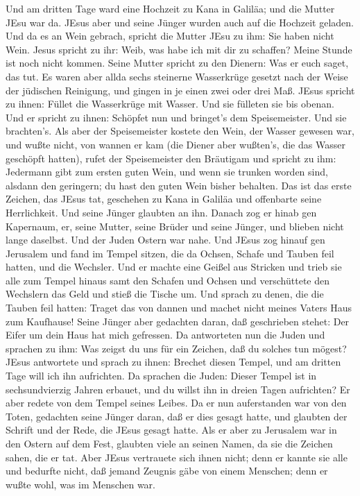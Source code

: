  Und am dritten Tage ward eine Hochzeit zu Kana in Galiläa;
und die Mutter JEsu war da.  JEsus aber und seine Jünger
wurden auch auf die Hochzeit geladen.  Und da es an Wein
gebrach, spricht die Mutter JEsu zu ihm: Sie haben nicht Wein.
 Jesus spricht zu ihr: Weib, was habe ich mit dir zu
schaffen? Meine Stunde ist noch nicht kommen.  Seine Mutter
spricht zu den Dienern: Was er euch saget, das tut.  Es
waren aber allda sechs steinerne Wasserkrüge gesetzt nach der Weise der
jüdischen Reinigung, und gingen in je einen zwei oder drei Maß.
 JEsus spricht zu ihnen: Füllet die Wasserkrüge mit Wasser.
Und sie fülleten sie bis obenan.  Und er spricht zu ihnen:
Schöpfet nun und bringet's dem Speisemeister. Und sie brachten's.
 Als aber der Speisemeister kostete den Wein, der Wasser
gewesen war, und wußte nicht, von wannen er kam (die Diener aber
wußten's, die das Wasser geschöpft hatten), rufet der Speisemeister den
Bräutigam  und spricht zu ihm: Jedermann gibt zum ersten
guten Wein, und wenn sie trunken worden sind, alsdann den geringern; du
hast den guten Wein bisher behalten.  Das ist das erste
Zeichen, das JEsus tat, geschehen zu Kana in Galiläa und offenbarte
seine Herrlichkeit. Und seine Jünger glaubten an ihn. 
Danach zog er hinab gen Kapernaum, er, seine Mutter, seine Brüder und
seine Jünger, und blieben nicht lange daselbst.  Und der
Juden Ostern war nahe. Und JEsus zog hinauf gen Jerusalem 
und fand im Tempel sitzen, die da Ochsen, Schafe und Tauben feil hatten,
und die Wechsler.  Und er machte eine Geißel aus Stricken
und trieb sie alle zum Tempel hinaus samt den Schafen und Ochsen und
verschüttete den Wechslern das Geld und stieß die Tische um.
 Und sprach zu denen, die die Tauben feil hatten: Traget
das von dannen und machet nicht meines Vaters Haus zum Kaufhause!
 Seine Jünger aber gedachten daran, daß geschrieben stehet:
Der Eifer um dein Haus hat mich gefressen.  Da antworteten
nun die Juden und sprachen zu ihm: Was zeigst du uns für ein Zeichen,
daß du solches tun mögest?  JEsus antwortete und sprach zu
ihnen: Brechet diesen Tempel, und am dritten Tage will ich ihn
aufrichten.  Da sprachen die Juden: Dieser Tempel ist in
sechsundvierzig Jahren erbauet, und du willst ihn in dreien Tagen
aufrichten?  Er aber redete von dem Tempel seines Leibes.
 Da er nun auferstanden war von den Toten, gedachten seine
Jünger daran, daß er dies gesagt hatte, und glaubten der Schrift und der
Rede, die JEsus gesagt hatte.  Als er aber zu Jerusalem war
in den Ostern auf dem Fest, glaubten viele an seinen Namen, da sie die
Zeichen sahen, die er tat.  Aber JEsus vertrauete sich
ihnen nicht; denn er kannte sie alle  und bedurfte nicht,
daß jemand Zeugnis gäbe von einem Menschen; denn er wußte wohl, was im
Menschen war.

